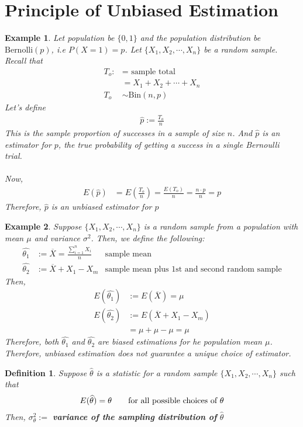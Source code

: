 \documentclass[11pt,oneside]{book}
\theoremstyle{newStyle}
\newtheorem{defn}[thm]{Definition}
\newtheorem{ex}{Example}[section]
\begin{document}
\section[Principle of Unbiased Estimation]{Principle of Unbiased Estimation}
\begin{ex}
Let population be $\{0,1\}$ and the population distribution be $\text{Bernolli}(p)$, i.e $P(X=1)=p$. Let $\{X_1,X_2,\cdots,X_n\}$ be a random sample. Recall that \begin{align*}
T_o:&=\text{ sample total}\\
&=X_1+X_2+\cdots+X_n\\
T_o&\sim \text{Bin}(n,p)
\end{align*}
Let's define \begin{align*}
\hat{p}:=\frac{T_o}{n}
\end{align*}
This is the sample proportion of successes in a sample of size $n$. And $\widehat{p}$ is an estimator for $p$, the true probability of getting a success in a single Bernoulli trial.\\
\hfill\\
Now, \begin{align*}
E(\widehat{p})&=E\left(\frac{T_o}{n} \right)=\frac{E(T_o)}{n}=\frac{n\cdot p}{n}=p
\end{align*}
Therefore, $\widehat{p}$ is an unbiased estimator for $p$
\end{ex}
\begin{ex}
Suppose $\{X_1,X_2,\cdots,X_n\}$ is a random sample from a population with mean $\mu$ and variance $\sigma^2$. Then, we define the following: \begin{align*}
\widehat{\theta_1}&:=\overline{X}=\frac{\sum_{i=1}^nX_i}{n} &\text{sample mean}\\
\widehat{\theta_2}&:=\overline{X}+X_1-X_m& \text{sample mean plus 1st and second random sample}
\end{align*}
Then, \begin{align*}
E(\widehat{\theta_1})&:=E(\overline{X})=\mu\\
E(\widehat{\theta_2})&:=E(\overline{X}+X_1-X_m)\\
&=\mu+\mu-\mu = \mu
\end{align*}
Therefore, both $\widehat{\theta_1}$ and $\widehat{\theta_2}$ are biased estimations for he population mean $\mu$. Therefore, unbiased estimation does not guarantee a unique choice of estimator.
\end{ex}
\begin{defn}
Suppose $\widehat{\theta}$ is a statistic for a random sample $\{X_1,X_2,\cdots,X_n\}$ such that \begin{align*}
E(\widehat{\theta})=\theta \text{\qquad for all possible choices of }\theta 
\end{align*}
Then, $\sigma_{\theta}^2:=$ \textbf{variance of the sampling distribution of }$\widehat{\theta}$
\end{defn}
\end{document}
